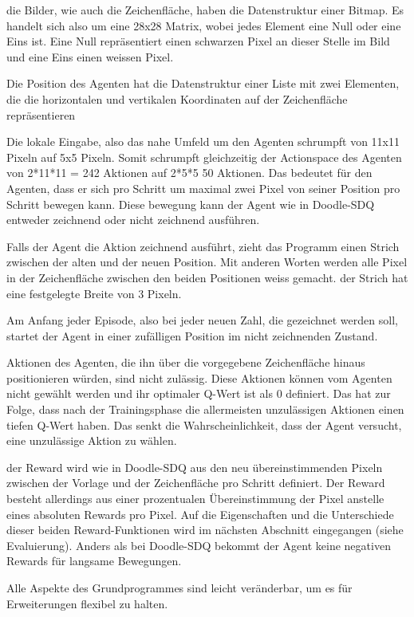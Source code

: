 die Bilder, wie auch die Zeichenfläche, haben die Datenstruktur einer Bitmap. Es
handelt sich also um eine 28x28 Matrix, wobei jedes Element eine Null oder eine
Eins ist. Eine Null repräsentiert einen schwarzen Pixel an dieser Stelle im Bild
und eine Eins einen weissen Pixel.

Die Position des Agenten hat die Datenstruktur einer Liste mit zwei Elementen,
die die horizontalen und vertikalen Koordinaten auf der Zeichenfläche
repräsentieren

Die lokale Eingabe, also das nahe Umfeld um den Agenten schrumpft von 11x11
Pixeln auf 5x5 Pixeln. Somit schrumpft gleichzeitig der Actionspace des Agenten
von 2*11*11 = 242 Aktionen auf 2*5*5 50 Aktionen. Das bedeutet für den Agenten,
dass er sich pro Schritt um maximal zwei Pixel von seiner Position pro Schritt
bewegen kann. Diese bewegung kann der Agent wie in Doodle-SDQ entweder
zeichnend oder nicht zeichnend ausführen.

Falls der Agent die Aktion zeichnend ausführt, zieht das Programm einen Strich
zwischen der alten und der neuen Position. Mit anderen Worten werden alle Pixel
in der Zeichenfläche zwischen den beiden Positionen weiss gemacht. der Strich
hat eine festgelegte Breite von 3 Pixeln.

Am Anfang jeder Episode, also bei jeder neuen Zahl, die gezeichnet werden soll,
startet der Agent in einer zufälligen Position im nicht zeichnenden Zustand.

Aktionen des Agenten, die ihn über die vorgegebene Zeichenfläche hinaus
positionieren würden, sind nicht zulässig. Diese Aktionen können vom Agenten
nicht gewählt werden und ihr optimaler Q-Wert ist als 0 definiert. Das hat zur
Folge, dass nach der Trainingsphase die allermeisten unzulässigen Aktionen einen
tiefen Q-Wert haben. Das senkt die Wahrscheinlichkeit, dass der Agent versucht,
eine unzulässige Aktion zu wählen.

der Reward wird wie in Doodle-SDQ aus den neu übereinstimmenden Pixeln zwischen
der Vorlage und der Zeichenfläche pro Schritt definiert. Der Reward besteht
allerdings aus einer prozentualen Übereinstimmung der Pixel anstelle eines
absoluten Rewards pro Pixel. Auf die Eigenschaften und die Unterschiede dieser
beiden Reward-Funktionen wird im nächsten Abschnitt eingegangen (siehe
Evaluierung). Anders als bei Doodle-SDQ bekommt der Agent keine negativen
Rewards für langsame Bewegungen. 

Alle Aspekte des Grundprogrammes sind leicht veränderbar, um es für
Erweiterungen flexibel zu halten.


